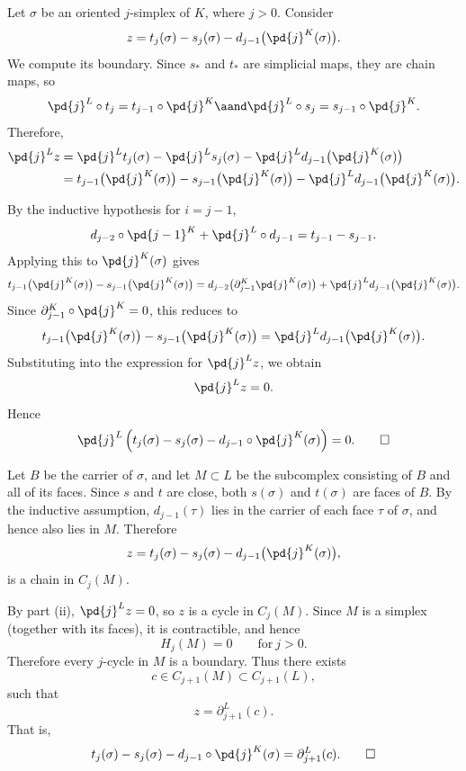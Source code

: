 \begin{solution}[(ii)]
  Let $\sigma$ be an oriented $j$-simplex of $K$, where $j>0$. Consider
  \[%
    z = t_j(\sigma) - s_j(\sigma) - d_{j-1}\big(\pd{j}^K(\sigma)\big)
  .\]%
  We compute its boundary. Since $s_*$ and $t_*$ are simplicial maps, they are chain maps, so
  \[%
    \pd{j}^L \circ t_j = t_{j-1} \circ \pd{j}^K \aand \pd{j}^L \circ s_j = s_{j-1} \circ \pd{j}^K
  .\]%
  Therefore,
  \begin{align*}
    \pd{j}^L z &= \pd{j}^L t_j(\sigma) - \pd{j}^L s_j(\sigma) - \pd{j}^L d_{j-1}\big(\pd{j}^K(\sigma)\big) \\
               &= t_{j-1}\big(\pd{j}^K(\sigma)\big) - s_{j-1}\big(\pd{j}^K(\sigma)\big) - \pd{j}^L d_{j-1}\big(\pd{j}^K(\sigma)\big)
  .\end{align*}

  By the inductive hypothesis for $i = j - 1$,
  \[%
    d_{j-2}\circ \pd{{}j-1}^K + \pd{j}^L \circ d_{j-1} = t_{j-1} - s_{j-1}.
  \]%
  Applying this to $\pd{j}^K(\sigma)$ gives
  \[%
    t_{j-1}\big(\pd{j}^K(\sigma)\big) - s_{j-1}\big(\pd{j}^K(\sigma)\big) = d_{j-2}\big(\partial_{j-1}^K \pd{j}^K(\sigma)\big) + \pd{j}^L d_{j-1}\big(\pd{j}^K(\sigma)\big)
  .\]%
  Since $\partial_{j-1}^K \circ \pd{j}^K = 0$, this reduces to
  \[%
    t_{j-1}\big(\pd{j}^K(\sigma)\big) - s_{j-1}\big(\pd{j}^K(\sigma)\big) = \pd{j}^L d_{j-1}\big(\pd{j}^K(\sigma)\big)
  .\]%
  Substituting into the expression for $\pd{j}^L z$, we obtain
  \[%
    \pd{j}^L z = 0
  .\]%
  Hence
  \[%
    \pd{j}^L\left(t_j(\sigma) - s_j(\sigma) - d_{j-1}\circ \pd{j}^K(\sigma)\right) = 0
  .\qedhere\]%
\end{solution}

\begin{solution}[(iii)]
  Let $B$ be the carrier of $\sigma$, and let $M \subset L$ be the subcomplex consisting of $B$ and all of its faces. Since $s$ and $t$ are close, both $s(\sigma)$ and $t(\sigma)$ are faces of $B$. By the inductive assumption, $d_{j-1}(\tau)$ lies in the carrier of each face $\tau$ of $\sigma$, and hence also lies in $M$. Therefore
  \[%
    z = t_j(\sigma) - s_j(\sigma) - d_{j-1}\big(\pd{j}^K(\sigma)\big)
  ,\]%
  is a chain in $C_j(M)$.

  By part (ii), $\pd{j}^L z = 0$, so $z$ is a cycle in $C_j(M)$. Since $M$ is a simplex (together with its faces), it is contractible, and hence
  \[%
    H_j(M) = 0 \qquad \text{for}~j > 0
  .\]%
  Therefore every $j$-cycle in $M$ is a boundary. Thus there exists
  \[%
    c \in C_{j+1}(M) \subset C_{j+1}(L)
  ,\]%
  such that
  \[%
    z = \partial_{j+1}^L(c)
  .\]%
  That is,
  \[%
    t_j(\sigma) - s_j(\sigma) - d_{j-1}\circ \pd{j}^K(\sigma) = \partial_{j+1}^L(c)
  .\qedhere\]%
\end{solution}

